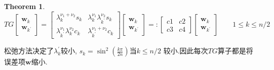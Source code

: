 \documentclass[a4paper]{book}
\numberwithin{equation}{chapter}
\theoremstyle{definition}
\newtheorem{thm}{Theorem}[chapter]
\begin{document}
\begin{thm}
	\[TG \begin{bmatrix}
	\mathbf{w}_k \\
	\mathbf{w}_{k^{'}}
	\end{bmatrix} = 
	\begin{bmatrix}
	\lambda^{\nu_1 + \nu_2}_k s_k & \lambda^{\nu_1}_k \lambda^{\nu_2}_{k^{'}} s_k \\
	\lambda^{\nu_1}_{k^{'}} \lambda^{\nu_2}_{k} c_k  & \lambda^{\nu_1 + \nu_2}_{k^{'}} c_k
	\end{bmatrix} 
	\begin{bmatrix}
	\mathbf{w}_k \\ 
	\mathbf{w}_{k^{'}}
	\end{bmatrix}
	=:
	\begin{bmatrix}
	c1 & c2 \\
	c3 & c4
	\end{bmatrix}
	\begin{bmatrix}
	\mathbf{w}_k \\ 
	\mathbf{w}_{k^{'}}
	\end{bmatrix}  \qquad  1 \leq k \leq n/2\]
	
	松弛方法决定了$\lambda_k^{'}$较小, $s_k = \sin^2\left(\frac{k\pi}{2n}\right)$当$k \leq n/2$ 较小.因此每次$TG$算子都是将误差项$\mathbf{w}$缩小.
\end{thm}
\end{document}
